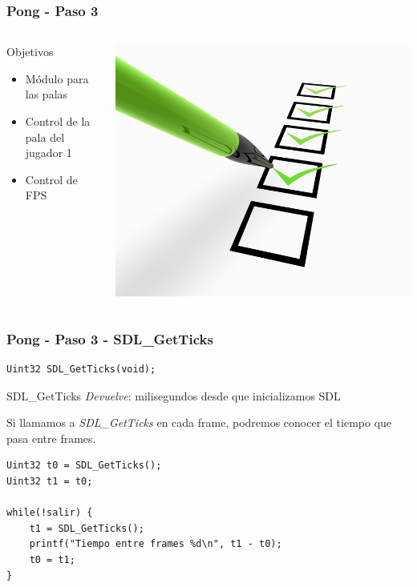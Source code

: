 \begin{frame}
	\frametitle{Pong - Paso 3}
    \begin{columns}[c]
	\column{175pt}
	\begin{block}{Objetivos}
		\begin{itemize}
			\item Módulo para las palas
			\item Control de la pala del jugador 1
			\item Control de FPS
		\end{itemize}            
	\end{block}

    \column{125pt}
	\begin{center}
		\includegraphics[scale=0.6]{img/checklist.jpg}
	\end{center}	
	
    \end{columns}
\end{frame}

\begin{frame}[fragile]
    \frametitle{Pong - Paso 3 - SDL\_GetTicks}
	
\begin{verbatim}
Uint32 SDL_GetTicks(void);
\end{verbatim}

    \begin{block}{SDL\_GetTicks}
	\emph{Devuelve}: milisegundos desde que inicializamos SDL
    \end{block}
    
    Si llamamos a \emph{SDL\_GetTicks} en cada frame, podremos conocer
    el tiempo que pasa entre frames.
    
\begin{verbatim}
Uint32 t0 = SDL_GetTicks();
Uint32 t1 = t0;

while(!salir) {
    t1 = SDL_GetTicks();
    printf("Tiempo entre frames %d\n", t1 - t0);
    t0 = t1;
}
\end{verbatim}

\end{frame}

